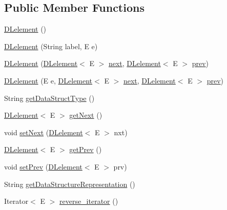 \subsection*{Public Member Functions}
\begin{DoxyCompactItemize}
\item 
\hyperlink{classbridges_1_1base_1_1_d_lelement_a525b572340e161d9c430baff10b64ab2}{D\+Lelement} ()
\item 
\hyperlink{classbridges_1_1base_1_1_d_lelement_a6aa1d4a3dad4a196c2ed079d108562bc}{D\+Lelement} (String label, E e)
\item 
\hyperlink{classbridges_1_1base_1_1_d_lelement_ab1e4eace66bb1b097463c4f04e964cd0}{D\+Lelement} (\hyperlink{classbridges_1_1base_1_1_d_lelement}{D\+Lelement}$<$ E $>$ \hyperlink{classbridges_1_1base_1_1_s_lelement_abf61c96a74ad319d561c6952ea388e0e}{next}, \hyperlink{classbridges_1_1base_1_1_d_lelement}{D\+Lelement}$<$ E $>$ \hyperlink{classbridges_1_1base_1_1_d_lelement_a6eba4876f820b75ac6bde01d7dea9da7}{prev})
\item 
\hyperlink{classbridges_1_1base_1_1_d_lelement_a3ffba30204a2ea6939b07b0ded123af5}{D\+Lelement} (E e, \hyperlink{classbridges_1_1base_1_1_d_lelement}{D\+Lelement}$<$ E $>$ \hyperlink{classbridges_1_1base_1_1_s_lelement_abf61c96a74ad319d561c6952ea388e0e}{next}, \hyperlink{classbridges_1_1base_1_1_d_lelement}{D\+Lelement}$<$ E $>$ \hyperlink{classbridges_1_1base_1_1_d_lelement_a6eba4876f820b75ac6bde01d7dea9da7}{prev})
\item 
String \hyperlink{classbridges_1_1base_1_1_d_lelement_a4a0e8f7bd377a652927a741e70aae6d3}{get\+Data\+Struct\+Type} ()
\item 
\hyperlink{classbridges_1_1base_1_1_d_lelement}{D\+Lelement}$<$ E $>$ \hyperlink{classbridges_1_1base_1_1_d_lelement_a35e88e8d991d6f23ec63b3ef3f6cce4e}{get\+Next} ()
\item 
void \hyperlink{classbridges_1_1base_1_1_d_lelement_aa18aff21854e4fe372dfefef04b325fe}{set\+Next} (\hyperlink{classbridges_1_1base_1_1_d_lelement}{D\+Lelement}$<$ E $>$ nxt)
\item 
\hyperlink{classbridges_1_1base_1_1_d_lelement}{D\+Lelement}$<$ E $>$ \hyperlink{classbridges_1_1base_1_1_d_lelement_a859f08f38513ecdfff0eb11bd2b98ce7}{get\+Prev} ()
\item 
void \hyperlink{classbridges_1_1base_1_1_d_lelement_a152a06add922290d48b2d4affc87d592}{set\+Prev} (\hyperlink{classbridges_1_1base_1_1_d_lelement}{D\+Lelement}$<$ E $>$ prv)
\item 
String \hyperlink{classbridges_1_1base_1_1_d_lelement_aefe2e582992a9e574d733f109add80f2}{get\+Data\+Structure\+Representation} ()
\item 
Iterator$<$ E $>$ \hyperlink{classbridges_1_1base_1_1_d_lelement_aaa90db2862f43b5ef07face87fcd8588}{reverse\+\_\+iterator} ()
\end{DoxyCompactItemize}
